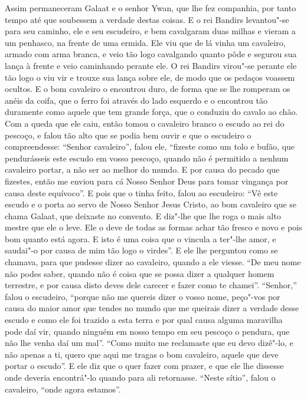 Assim permaneceram Galaat e o senhor Ywan, que lhe fez companhia, por tanto
tempo até que soubessem a verdade destas coisas. E o rei Bandirs levantou"-se
para seu caminho, ele e seu escudeiro, e bem cavalgaram duas milhas e vieram a
um penhasco, na frente de uma ermida. Ele viu que de lá vinha um cavaleiro,
armado com arma branca, e veio tão logo cavalgando quanto pôde e segurou sua
lança à frente e veio caminhando perante ele. O rei Bandirs virou"-se perante
ele tão logo o viu vir e trouxe sua lança sobre ele, de modo que os pedaços
voassem ocultos. E o bom cavaleiro o encontrou duro, de forma que se lhe
romperam os anéis da coifa, que o ferro foi através do lado esquerdo e o
encontrou tão duramente como aquele que tem grande força, que o conduziu do
cavalo ao chão. Com a queda que ele caiu, então tomou o cavaleiro branco o
escudo ao rei do pescoço, e falou tão alto que se podia bem ouvir e que o
escudeiro o compreendesse: “Senhor cavaleiro”, falou ele, “fizeste como um tolo
e bufão, que pendurásseis este escudo em vosso pescoço, quando não é permitido
a nenhum cavaleiro portar, a não ser ao melhor do mundo. E por causa do pecado
que fizestes, então me enviou para cá Nosso Senhor Deus para tomar vingança por
causa deste equívoco”. E pois que o tinha feito, falou ao escudeiro:
“Vê este escudo e o porta ao servo de Nosso Senhor Jesus Cristo, ao bom
cavaleiro que se chama Galaat, que deixaste no convento. E diz"-lhe que lhe roga
o mais alto mestre que ele o leve. Ele o deve de todas as formas achar tão
fresco e novo e pois bom quanto está agora. E isto é uma coisa que o vincula a
ter"-lhe amor, e saudai"-o por causa de mim tão logo o virdes”.  E ele
lhe perguntou como se chamava, para que pudesse dizer ao cavaleiro, quando a
ele viesse. “De meu nome não podes saber, quando não é coisa que se possa dizer
a qualquer homem terrestre, e por causa disto deves dele carecer e fazer como
te chamei”. “Senhor,” falou o escudeiro, “porque não me quereis dizer o
vosso nome, peço"-vos por causa do maior amor que tendes no mundo que me
queirais dizer a verdade desse escudo e como ele foi trazido a esta terra e por
qual causa alguma maravilha pode daí vir, quando ninguém em nosso tempo em seu
pescoço o pendura, que não lhe venha daí um mal”. “Como muito me reclamaste que
eu devo dizê"-lo, e não apenas a ti, quero que aqui me tragas o bom
cavaleiro, aquele que deve portar o escudo”. E ele diz que o quer fazer com
prazer, e que ele lhe dissesse onde deveria encontrá"-lo quando para ali
retornasse. “Neste sítio”, falou o cavaleiro, “onde agora estamos”.  

